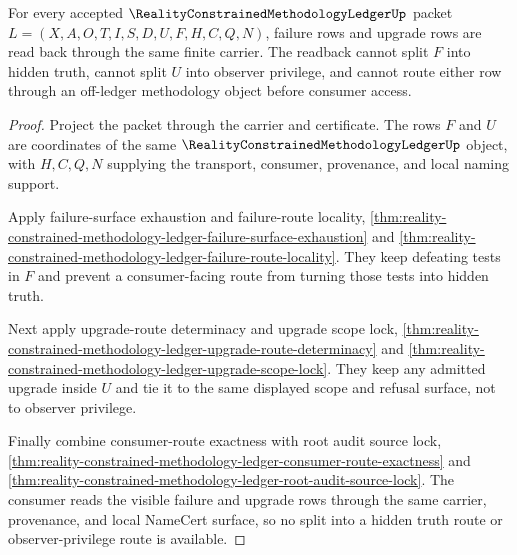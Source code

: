 \begin{theorem}
\label{thm:reality-constrained-methodology-ledger-failure-upgrade-readback}
For every accepted $\RealityConstrainedMethodologyLedgerUp$ packet
$L=(X,A,O,T,I,S,D,U,F,H,C,Q,N)$, failure rows and upgrade rows are read back
through the same finite carrier. The readback cannot split $F$ into hidden
truth, cannot split $U$ into observer privilege, and cannot route either row
through an off-ledger methodology object before consumer access.
\end{theorem}
\begin{proof}
Project the packet through the carrier and certificate. The rows $F$ and $U$
are coordinates of the same $\RealityConstrainedMethodologyLedgerUp$ object,
with $H,C,Q,N$ supplying the transport, consumer, provenance, and local naming
support.

Apply failure-surface exhaustion and failure-route locality,
\autoref{thm:reality-constrained-methodology-ledger-failure-surface-exhaustion}
and
\autoref{thm:reality-constrained-methodology-ledger-failure-route-locality}.
They keep defeating tests in $F$ and prevent a consumer-facing route from
turning those tests into hidden truth.

Next apply upgrade-route determinacy and upgrade scope lock,
\autoref{thm:reality-constrained-methodology-ledger-upgrade-route-determinacy}
and
\autoref{thm:reality-constrained-methodology-ledger-upgrade-scope-lock}. They
keep any admitted upgrade inside $U$ and tie it to the same displayed scope and
refusal surface, not to observer privilege.

Finally combine consumer-route exactness with root audit source lock,
\autoref{thm:reality-constrained-methodology-ledger-consumer-route-exactness}
and
\autoref{thm:reality-constrained-methodology-ledger-root-audit-source-lock}.
The consumer reads the visible failure and upgrade rows through the same
carrier, provenance, and local NameCert surface, so no split into a hidden
truth route or observer-privilege route is available.
\end{proof}

